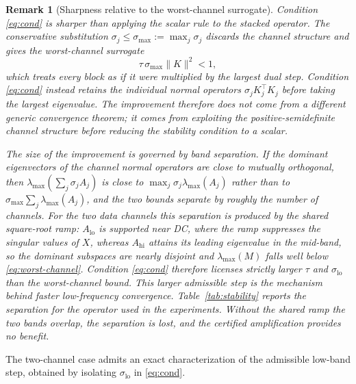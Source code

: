 \documentclass{article}
\newtheorem{remark}[theorem]{Remark}
\begin{document}
\begin{remark}[Sharpness relative to the worst-channel surrogate]
\label{rmk:tight}
Condition \eqref{eq:cond} is sharper than applying the scalar rule to the stacked operator. The conservative substitution $\sigma_j\le\sigma_{\max}:=\max_j\sigma_j$ discards the channel structure and gives the worst-channel surrogate
\begin{equation}
\label{eq:worst-channel}
\tau\,\sigma_{\max}\|K\|^2<1,
\end{equation}
which treats every block as if it were multiplied by the largest dual step. Condition \eqref{eq:cond} instead retains the individual normal operators $\sigma_jK_j^\top K_j$ before taking the largest eigenvalue. The improvement therefore does not come from a different generic convergence theorem; it comes from exploiting the positive-semidefinite channel structure before reducing the stability condition to a scalar.

The size of the improvement is governed by band separation. If the dominant eigenvectors of the channel normal operators are close to mutually orthogonal, then $\lambda_{\max}(\sum_j\sigma_jA_j)$ is close to $\max_j\sigma_j\lambda_{\max}(A_j)$ rather than to $\sigma_{\max}\sum_j\lambda_{\max}(A_j)$, and the two bounds separate by roughly the number of channels. For the two data channels this separation is produced by the shared square-root ramp: $A_{\mathrm{lo}}$ is supported near DC, where the ramp suppresses the singular values of $X$, whereas $A_{\mathrm{hi}}$ attains its leading eigenvalue in the mid-band, so the dominant subspaces are nearly disjoint and $\lambda_{\max}(M)$ falls well below \eqref{eq:worst-channel}. Condition \eqref{eq:cond} therefore licenses strictly larger $\tau$ and $\sigma_{\mathrm{lo}}$ than the worst-channel bound. This larger admissible step is the mechanism behind faster low-frequency convergence. Table~\ref{tab:stability} reports the separation for the operator used in the experiments. Without the shared ramp the two bands overlap, the separation is lost, and the certified amplification provides no benefit.
\end{remark}

The two-channel case admits an exact characterization of the admissible low-band step, obtained by isolating $\sigma_{\mathrm{lo}}$ in \eqref{eq:cond}.
\end{document}
